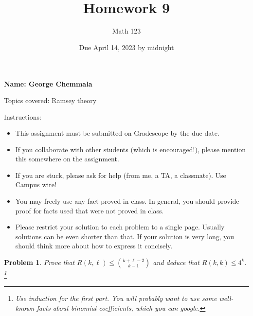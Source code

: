 \documentclass[11pt]{article}
\author{Math 123}
\date{Due April 14, 2023 by midnight}
\title{Homework 9}
\newtheorem{problem}{Problem}
\begin{document}
\maketitle

{\bf\Large Name: George Chemmala} 


\vspace{.3in}
Topics covered: Ramsey theory

Instructions: 
\begin{itemize}
\item This assignment must be submitted on Gradescope by the due date. 
\item If you collaborate with other students (which is encouraged!), please mention this somewhere on the assignment. 
\item If you are stuck, please ask for help (from me, a TA, a classmate). Use Campus wire!  
\item You may freely use any fact proved in class. In general, you should provide proof for facts used that were not proved in class. 
\item Please restrict your solution to each problem to a single page. Usually solutions can be even shorter than that. If your solution is very long, you should think more about how to express it concisely.
\end{itemize}


\pagebreak 


\begin{problem}
Prove that $R(k,\ell)\le{k+\ell-2\choose k-1}$ and deduce that $R(k,k)\le 4^k$. \footnote{Use induction for the first part. You will probably want to use some well-known facts about binomial coefficients, which you can google.} 
\end{problem}
\end{document}
